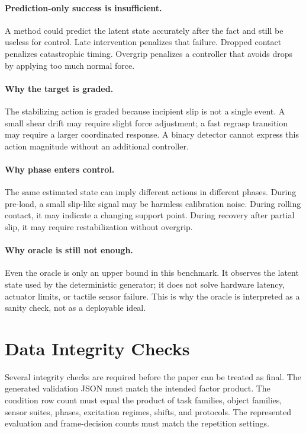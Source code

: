 \documentclass{article}
\begin{document}
\paragraph{Prediction-only success is insufficient.}
A method could predict the latent state accurately after the fact and still be useless for control. Late intervention penalizes that failure. Dropped contact penalizes catastrophic timing. Overgrip penalizes a controller that avoids drops by applying too much normal force.

\paragraph{Why the target is graded.}
The stabilizing action is graded because incipient slip is not a single event. A small shear drift may require slight force adjustment; a fast regrasp transition may require a larger coordinated response. A binary detector cannot express this action magnitude without an additional controller.

\paragraph{Why phase enters control.}
The same estimated state can imply different actions in different phases. During pre-load, a small slip-like signal may be harmless calibration noise. During rolling contact, it may indicate a changing support point. During recovery after partial slip, it may require restabilization without overgrip.

\paragraph{Why oracle is still not enough.}
Even the oracle is only an upper bound in this benchmark. It observes the latent state used by the deterministic generator; it does not solve hardware latency, actuator limits, or tactile sensor failure. This is why the oracle is interpreted as a sanity check, not as a deployable ideal.

\section{Data Integrity Checks}

Several integrity checks are required before the paper can be treated as final. The generated validation JSON must match the intended factor product. The condition row count must equal the product of task families, object families, sensor suites, phases, excitation regimes, shifts, and protocols. The represented evaluation and frame-decision counts must match the repetition settings.
\end{document}
